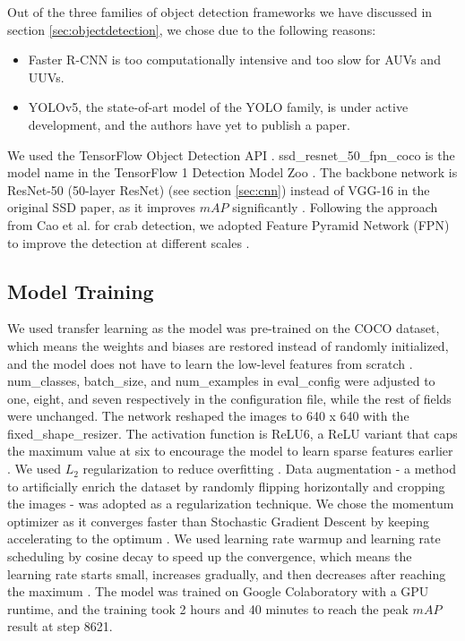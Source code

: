 \documentclass[a4paper, 11pt, oneside]{article}
\begin{document}
Out of the three families of object detection frameworks we have discussed in section \ref{sec:objectdetection}, we chose
due to the following reasons:

\begin{itemize}
  \item Faster R-CNN is too computationally intensive and too slow for AUVs and UUVs.
  \item YOLOv5, the state-of-art model of the YOLO family, is under active development, and the authors have yet to
  publish a paper.
\end{itemize}

We used the TensorFlow Object Detection API \cite{huang2017speed, tfobjectdetection}. ssd\_resnet\_50\_fpn\_coco
is the model name in the TensorFlow 1 Detection Model Zoo \cite{tf1detectionmodelzoo}. The backbone network
is ResNet-50 (50-layer ResNet) (see section \ref{sec:cnn}) instead of VGG-16 in the original SSD paper, as it
improves $mAP$ significantly \cite{he2016deep}. Following the approach from Cao et al. \cite{cao2020real} for crab
detection, we adopted Feature Pyramid Network (FPN) to improve the detection at different scales \cite{lin2017feature}.

\subsection{Model Training}

We used transfer learning \cite{torrey2010transfer} as the model was pre-trained on the COCO dataset, which means the
weights and biases are restored instead of randomly initialized, and the model does not have to learn the low-level
features from scratch \cite{geron2019hands}. num\_classes, batch\_size, and num\_examples in eval\_config were adjusted
to one, eight, and seven respectively in the configuration file, while the rest of fields were unchanged. The network
reshaped the images to 640 x 640 with the fixed\_shape\_resizer. The activation function is ReLU6, a ReLU variant that
caps the maximum value at six to encourage the model to learn sparse features earlier \cite{krizhevsky2010convolutional}.
We used $L_2$ regularization \cite{ng2004feature} to reduce overfitting \cite{hawkins2004problem}. Data augmentation
\cite{krizhevsky2012imagenet} - a method to artificially enrich the dataset by randomly flipping horizontally and cropping
the images - was adopted as a regularization technique. We chose the momentum optimizer \cite{polyak1964some} as it
converges faster than Stochastic Gradient Descent \cite{bottou2010large} by keeping accelerating to the optimum
\cite{geron2019hands}. We used learning rate warmup and learning rate scheduling by cosine decay to speed up the
convergence, which means the learning rate starts small, increases gradually, and then decreases after reaching the
maximum \cite{geron2019hands, goyal2017accurate, senior2013empirical, loshchilov2016sgdr}.
The model was trained on Google Colaboratory \cite{colab} with a GPU runtime, and the training took 2 hours and 40
minutes to reach the peak $mAP$ result at step 8621.
\end{document}
